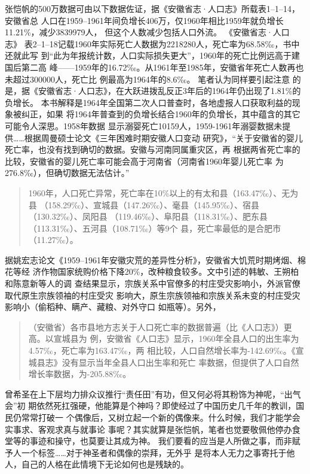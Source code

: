 张恺帆的500万数据可由以下数据佐证，据《安徽省志·人口志》所载表1--1--14，安徽省总
人口在1959--1961年间负增长406万，仅1960年相比1959年就负增长11.21\%，减少3839979人，
但这个人数减少包括人口外流。 《安徽省志·人口志》
表2--1--18记载1960年实际死亡人数据为2218280人，死亡率为68.58‰，书中还就此写
到``此为年报统计数，人口实际损失更大''，1960年的死亡比例远高于建国后第二高
峰——1959年的16.72‰。从1961年至1985年，安徽省年死亡人数再也未超过300000人，死亡比
例最高为1964年的8.6‰。 笔者认为同样要引起注意
的是，据《安徽省志·人口志》，在大跃进拨乱反正3年后的1964年仍出现了1.81\%的负增长。
本书解释是1964年全国第二次人口普查时，各地虚报人口获取利益的现象被纠正，如果
将1964年普查到的负增长结合1960年的负增长，其中蕴含的其它可能令人深思。1958年数据
显示溺婴死亡10159人，1959-1961年溺婴数据未提
供……根据周曼硕士论文《三年困难时期安徽人口变动
研究》，``关于安徽省的婴儿死亡率，也没有找到确切的数据。安徽与河南同属重灾区，再
根据两省死亡率的比较，安徽省的婴儿死亡率可能会高于河南省（河南省1960年婴儿死亡率
为276.8‰），但确切数据无法估计。''


\begin{quotation}
  1960年，人口死亡异常，死亡率在10\%以上的有太和县（163.47‰）、无为县
  （158.29‰）、宣城县（147.26‰）、毫县（145.95‰）、宿县（130.32‰）、凤阳县
  （119.46‰）、阜阳县（118.31‰）、肥东县（113.31‰）、五河县（108.71‰）等9个
  县，死亡率最低的是合肥市（11.27‰）。 
\end{quotation}

据姚宏志论文《1959--1961年安徽灾荒的差异性分析》，安徽省大饥荒时期烤烟、棉花等经
济作物国家统购价格下降20\%，改种粮食较多。文中引述的韩敏、王朔柏和陈意新等人的调
查结果显示，宗族关系中官僚多的村庄受灾影响小，外派官僚取代原生宗族领袖的村庄受灾
影响大，原生宗族领袖和宗族关系未变的村庄受灾影响小（偷稻种、瞒产、藏粮、对外守口
如瓶等）。另外，
\begin{quotation}
  （安徽省）各市县地方志关于人口死亡率的数据普遍（比《人口志》）更高。以宣城县为
  例，安徽省《人口志》显示，1960年全县人口的出生率为4.57‰，死亡率为163.47‰，两
  相比较，人口自然增长率为-142.69‰。《宣城县志》没有显示当年全县人口出生率和死亡
  率数据，但提供了人口自然增长率数据，为-205.88‰。\cite{zaihuangchayixing}
\end{quotation}

曾希圣在上下层均力排众议推行``责任田''有功，但又何必将其粉饰为神呢，``出气会''初
期依然死扛强硬，他能算是个神吗？即使经过了中国历史几千年的教训，国民仍常常打破一
个偶像后，又树立起一个新的偶像来。什么时候，我们才能学会实事求、客观求真与就事论
事呢？其实就算是张恺帆，笔者也觉要敬佩他停办食堂等的事迹和操守，也莫要让其成为神。
我们要看的应当是人所做之事，而非赋予人一个标签……对于神圣者和偶像的崇拜，无外乎
是将本人无力之事寄托于他人，自己的人格在此情境下无论如何也是残缺的。

